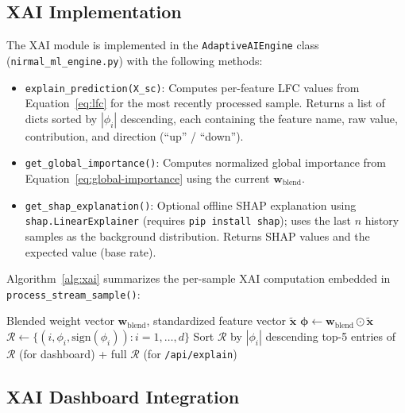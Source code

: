 \subsection{XAI Implementation}
\label{sec:meth-xai-impl}

The XAI module is implemented in the \texttt{AdaptiveAIEngine} class (\texttt{nirmal\_ml\_engine.py}) with the following methods:

\begin{itemize}
    \item \texttt{explain\_prediction(X\_sc)}: Computes per-feature LFC values from Equation~\ref{eq:lfc} for the most recently processed sample. Returns a list of dicts sorted by $|\phi_i|$ descending, each containing the feature name, raw value, contribution, and direction (``up'' / ``down'').
    \item \texttt{get\_global\_importance()}: Computes normalized global importance from Equation~\ref{eq:global-importance} using the current $\mathbf{w}_{\mathrm{blend}}$.
    \item \texttt{get\_shap\_explanation()}: Optional offline SHAP explanation using \texttt{shap.LinearExplainer} (requires \texttt{pip install shap}); uses the last $n$ history samples as the background distribution. Returns SHAP values and the expected value (base rate).
\end{itemize}

Algorithm~\ref{alg:xai} summarizes the per-sample XAI computation embedded in
\texttt{process\_stream\_sample()}:

\begin{algorithm}[htbp]
\caption{Per-sample LFC Explainability (appended to Algorithm~\ref{alg:decision-engine})}
\label{alg:xai}
\begin{algorithmic}[1]
\Require Blended weight vector $\mathbf{w}_{\mathrm{blend}}$, standardized feature vector $\tilde{\mathbf{x}}$
\State $\boldsymbol{\phi} \gets \mathbf{w}_{\mathrm{blend}} \odot \tilde{\mathbf{x}}$ 
\State $\mathcal{R} \gets \{(i, \phi_i, \mathrm{sign}(\phi_i)) : i = 1,\ldots,d\}$ 
\State Sort $\mathcal{R}$ by $|\phi_i|$ descending
\State \Return top-5 entries of $\mathcal{R}$ (for dashboard) + full $\mathcal{R}$ (for \texttt{/api/explain})
\end{algorithmic}
\end{algorithm}

\subsection{XAI Dashboard Integration}
\label{sec:meth-xai-dashboard}

